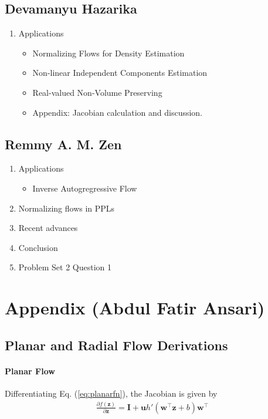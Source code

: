 \documentclass[runningheads]{llncs}
\begin{document}
\subsection*{Devamanyu Hazarika}
\begin{enumerate}
	\item Applications
	\begin{itemize}
		\item Normalizing Flows for Density Estimation 
		\item Non-linear Independent Components Estimation
		\item Real-valued Non-Volume Preserving
		\item Appendix: Jacobian calculation and discussion.
	\end{itemize}
\end{enumerate}


\subsection*{Remmy A. M. Zen}
\begin{enumerate}
	\item Applications
	\begin{itemize}
		\item Inverse Autogregressive Flow
	\end{itemize}
	\item Normalizing flows in PPLs
	\item Recent advances
	\item Conclusion
	\item Problem Set 2 Question 1
\end{enumerate}

\section{Appendix (Abdul Fatir Ansari)}

\subsection{Planar and Radial Flow Derivations}

\paragraph{Planar Flow} Differentiating Eq. (\ref{eq:planarfn}), the Jacobian is given by
\begin{align*}
\frac{\partial f(\mathbf{z})}{\partial \mathbf{z}} = \mathbf{I} + \mathbf{u}h'(\mathbf{w}^\top\mathbf{z} + b)\mathbf{w}^\top
\end{align*}
\end{document}

